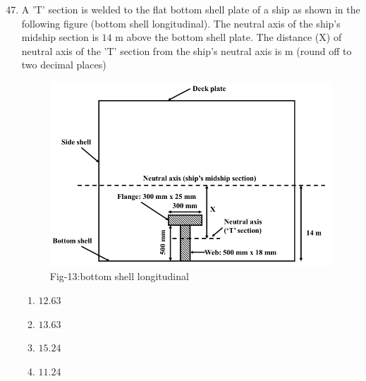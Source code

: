 \documentclass[journal]{IEEEtran}
\theoremstyle{remark}
\begin{document}
\begin{enumerate}[itemsep=1em]
\setcounter{enumi}{46}
\item A 'T' section is welded to the flat bottom shell plate of a ship as shown in the following figure (bottom shell longitudinal). The neutral axis of the ship's midship section is $14$ m above the bottom shell plate. The distance (X) of neutral 
axis of the 'T' section from the ship's neutral axis is \underline{\hspace{1cm}} m (round off to two decimal places) 
\begin{figure}[H]
    \centering
    \includegraphics[width=0.5\columnwidth]{figs/fig-13.jpeg}
    \caption*{Fig-13:bottom shell longitudinal}
    \label{fig-13}
\end{figure}
\begin{multicols}{4}
\begin{enumerate}
    \item $12.63$
    \item $13.63$
    \item $15.24$
    \item $11.24$
\end{enumerate}
\end{multicols}
\end{enumerate}
\end{document}
